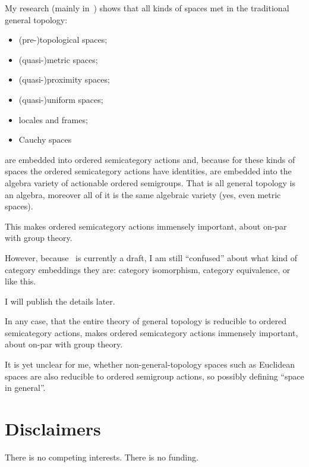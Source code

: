 \documentclass[a4paper,oneside,english,reqno]{amsart}
\begin{document}
My research (mainly in~\cite{volume-1}) shows that all kinds of spaces met in the  traditional general topology:
\begin{itemize}
\item (pre-)topological spaces;
\item (quasi-)metric spaces;
\item (quasi-)proximity spaces;
\item (quasi-)uniform spaces;
\item locales and frames;
\item Cauchy spaces
\end{itemize}
are embedded into ordered semicategory actions and, because for these kinds of spaces the ordered semicategory actions have identities, are embedded into the algebra variety of actionable ordered semigroups. That is all general topology is an algebra, moreover all of it is the same algebraic variety (yes, even metric spaces).

This makes ordered semicategory actions immensely important, about on-par with group theory.

However, because \cite{volume-1}~is currently a draft, I am still ``confused'' about what kind of category embeddings they are: category isomorphism, category equivalence, or like this.

I will publish the details later.

In any case, that the entire theory of general topology is reducible to ordered semicategory actions, makes ordered semicategory actions immensely important, about on-par with group theory.

It is yet unclear for me, whether non-ge\-ne\-ral-to\-po\-lo\-gy spaces such as Euclidean spaces are also reducible to ordered semigroup actions, so possibly defining ``space in general''.

\section{Disclaimers}

There is no competing interests. There is no funding.



\end{document}
